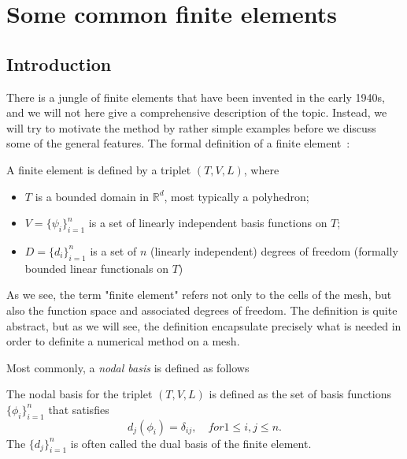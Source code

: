 \chapter{Some common finite elements}
\label{element}

\section{Introduction}

There is a jungle of finite elements that have been invented in the early 1940s, and we
will not here give a comprehensive description of the topic. Instead, we will try to motivate
the method by rather simple examples before we discuss some of the general features. 
The formal definition of a finite element~\cite{ciarlet2002finite}: 

\begin{defin}
A finite element is defined by a triplet $(T, V, L)$, where 
\begin{itemize}
\item $T$ is a bounded domain in $\mathbb{R}^d$, most typically a polyhedron; 
\item $V = \{\psi_i\}_{i=1}^n$ is a set of linearly independent basis functions on $T$; 
\item $D = \{d_i\}^n_{i=1}$ is a set of $n$ (linearly independent) 
  degrees of freedom (formally bounded linear functionals on $T$) 
\end{itemize}
\end{defin}
As we see, the term "finite element" refers not only to the cells of the mesh, but also the function space and associated degrees of freedom. The definition is quite abstract, but as we will see, the definition encapsulate precisely what is needed in order to definite a numerical method on a mesh. 

Most commonly, a \emph{nodal basis} is defined as follows 
\begin{defin}
\label{nodal:basis}
The nodal basis for the triplet  $(T, V, L)$ is defined as the set of basis functions
$\{\phi_i\}^n_{i=1}$ that satisfies  
\[
d_j(\phi_i) = \delta_{ij}, \quad for 1 \le i,j \le n. 
\]
The $\{d_j\}^n_{i=1}$ is often called the dual basis of the finite element.  
\end{defin}


